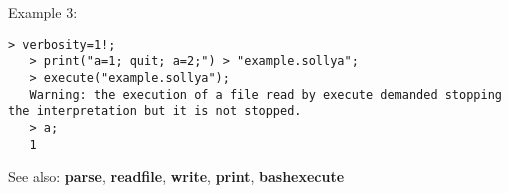 \noindent Example 3: 
\begin{center}\begin{minipage}{14.8cm}\begin{Verbatim}[frame=single]
   > verbosity=1!;
   > print("a=1; quit; a=2;") > "example.sollya";
   > execute("example.sollya"); 
   Warning: the execution of a file read by execute demanded stopping the interpretation but it is not stopped.
   > a;
   1
\end{Verbatim}
\end{minipage}\end{center}
See also: \textbf{parse}, \textbf{readfile}, \textbf{write}, \textbf{print}, \textbf{bashexecute}
